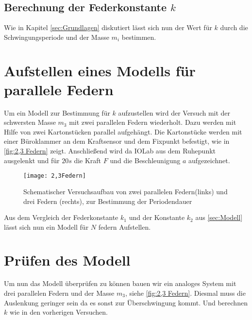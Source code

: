 \subsection{Berechnung der Federkonstante $k$}
Wie in Kapitel \autoref{sec:Grundlagen} diskutiert lässt sich nun der Wert für $k$ durch die Schwingungsperiode und der Masse $m_i$ bestimmen.
\section{Aufstellen eines Modells für parallele Federn}
\label{sec:Modell}
Um ein Modell zur Bestimmung für $k$ aufzustellen wird der Versuch mit der schwersten  Masse $m_3$ mit zwei parallelen Federn wiederholt. Dazu werden mit Hilfe von zwei Kartonstücken parallel aufgehängt. Die Kartonstücke werden mit einer Büroklammer an dem Kraftsensor und dem Fixpunkt befestigt, wie in \autoref{fig:2,3 Federn} zeigt. Anschließend wird da IOLab aus dem Ruhepunkt ausgelenkt und für $20s$ die Kraft $F$ und die Beschleunigung $a$ aufgezeichnet.
\begin{figure}[H]
	\centering
	\texttt{[image: 2,3Federn]}
	\caption[Versuchsaufbau mit mehrere Federn]{Schematischer Versuchsaufbau von zwei parallelen Federn(links) und drei Federn (rechts), zur Bestimmung der Periodendauer}
	\label{fig:2,3 Federn}
\end{figure}
Aus dem Vergleich der Federkonstante $k_1$ und der Konstante $k_2$ aus \autoref{sec:Modell} lässt sich nun ein Modell für $N$ federn Aufstellen.
\section{Prüfen des Modell}
Um nun das Modell überprüfen zu können bauen wir ein analoges System mit drei parallelen Federn und der Masse $m_3$, siehe \autoref{fig:2,3 Federn}. Diesmal muss die Auslenkung geringer sein da es sonst zur Überschwingung kommt. Und berechnen $k$ wie in den vorherigen Versuchen.